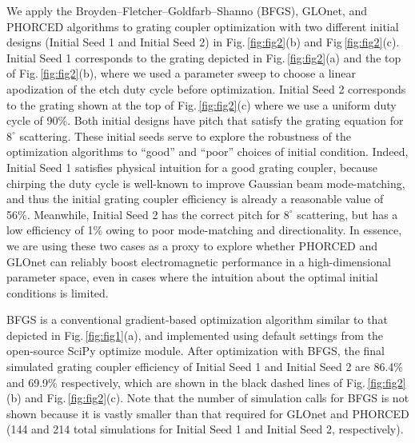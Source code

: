 \documentclass{article}
\begin{document}
We apply the Broyden–Fletcher–Goldfarb–Shanno (BFGS), GLOnet, and PHORCED algorithms to grating coupler optimization with two different initial designs (Initial Seed 1 and Initial Seed 2) in Fig.\,\ref{fig:fig2}(b) and Fig\,\ref{fig:fig2}(c). Initial Seed 1 corresponds to the grating depicted in Fig.\,\ref{fig:fig2}(a) and the top of Fig.\,\ref{fig:fig2}(b), where we used a parameter sweep to choose a linear apodization of the etch duty cycle before optimization. Initial Seed 2 corresponds to the grating shown at the top of Fig.\,\ref{fig:fig2}(c) where we use a uniform duty cycle of 90\%. Both initial designs have pitch that satisfy the grating equation \cite{michaels_inverse_2018, hooten_adjoint_2020} for $8^\circ$ scattering. These initial seeds serve to explore the robustness of the optimization algorithms to  ``good'' and ``poor'' choices of initial condition. Indeed, Initial Seed 1 satisfies physical intuition for a good grating coupler, because chirping the duty cycle is well-known to improve Gaussian beam mode-matching, and thus the initial grating coupler efficiency is already a reasonable value of 56\%. Meanwhile, Initial Seed 2 has the correct pitch for $8^\circ$ scattering, but has a low efficiency of 1\% owing to poor mode-matching and directionality. In essence, we are using these two cases as a proxy to explore whether PHORCED and GLOnet can reliably boost electromagnetic performance in a high-dimensional parameter space, even in cases where the intuition about the optimal initial conditions is limited.

BFGS is a conventional gradient-based optimization algorithm similar to that depicted in Fig.\,\ref{fig:fig1}(a), and implemented using default settings from the open-source SciPy optimize module. After optimization with BFGS, the final simulated grating coupler efficiency of Initial Seed 1 and Initial Seed 2 are 86.4\% and 69.9\% respectively, which are shown in the black dashed lines of Fig.\,\ref{fig:fig2}(b) and Fig.\,\ref{fig:fig2}(c). Note that the number of simulation calls for BFGS is not shown because it is vastly smaller than that required for GLOnet and PHORCED (144 and 214 total simulations for Initial Seed 1 and Initial Seed 2, respectively). 
\end{document}
